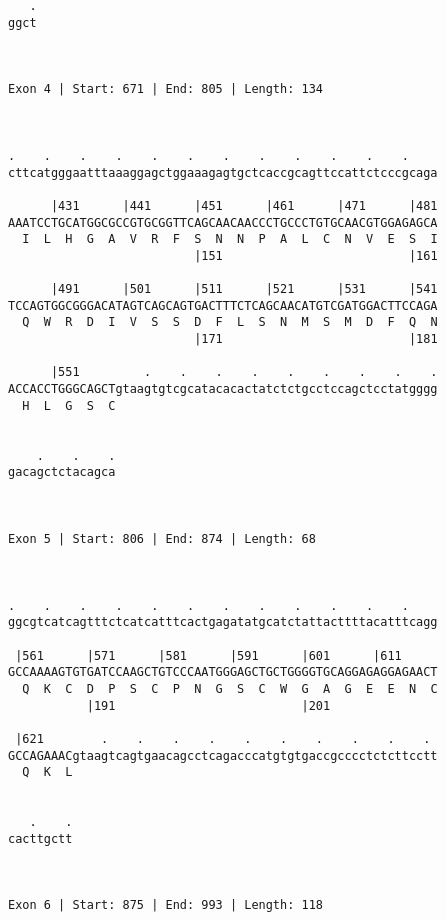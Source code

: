 \documentclass{article}
\begin{document}
{\begin{Verbatim}
   .
ggct
    
    
 
Exon 4 | Start: 671 | End: 805 | Length: 134



.    .    .    .    .    .    .    .    .    .    .    .    
cttcatgggaatttaaaggagctggaaagagtgctcaccgcagttccattctcccgcaga
                                                            
      |431      |441      |451      |461      |471      |481
AAATCCTGCATGGCGCCGTGCGGTTCAGCAACAACCCTGCCCTGTGCAACGTGGAGAGCA
  I  L  H  G  A  V  R  F  S  N  N  P  A  L  C  N  V  E  S  I
                          |151                          |161
  
      |491      |501      |511      |521      |531      |541
TCCAGTGGCGGGACATAGTCAGCAGTGACTTTCTCAGCAACATGTCGATGGACTTCCAGA
  Q  W  R  D  I  V  S  S  D  F  L  S  N  M  S  M  D  F  Q  N
                          |171                          |181
  
      |551         .    .    .    .    .    .    .    .    .
ACCACCTGGGCAGCTgtaagtgtcgcatacacactatctctgcctccagctcctatgggg
  H  L  G  S  C                                             
                                                            
  
    .    .    .
gacagctctacagca
               
               
 
Exon 5 | Start: 806 | End: 874 | Length: 68



.    .    .    .    .    .    .    .    .    .    .    .    
ggcgtcatcagtttctcatcatttcactgagatatgcatctattacttttacatttcagg
                                                            
 |561      |571      |581      |591      |601      |611     
GCCAAAAGTGTGATCCAAGCTGTCCCAATGGGAGCTGCTGGGGTGCAGGAGAGGAGAACT
  Q  K  C  D  P  S  C  P  N  G  S  C  W  G  A  G  E  E  N  C
           |191                          |201               
  
 |621        .    .    .    .    .    .    .    .    .    . 
GCCAGAAACgtaagtcagtgaacagcctcagacccatgtgtgaccgcccctctcttcctt
  Q  K  L                                                   
                                                            
  
   .    .
cacttgctt
         
         
 
Exon 6 | Start: 875 | End: 993 | Length: 118




\end{Verbatim}}
\end{document}
